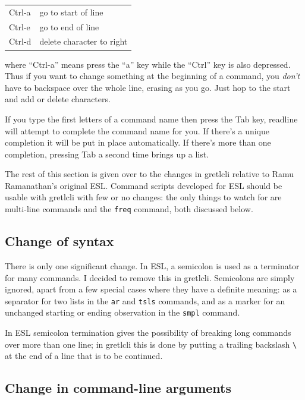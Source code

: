 \documentclass{article}
\begin{document}
\begin{center}
\begin{tabular}{ll}
Ctrl-a & go to start of line\\
Ctrl-e & go to end of line\\
Ctrl-d & delete character to right
\end{tabular}
\end{center}

\noindent
where ``Ctrl-a'' means press the ``a'' key while the ``Ctrl'' key is
also depressed.  Thus if you want to change something at the beginning
of a command, you \textit{don't} have to backspace over the whole
line, erasing as you go.  Just hop to the start and add or delete
characters.

If you type the first letters of a command name then press the Tab
key, readline will attempt to complete the command name for you.  If
there's a unique completion it will be put in place automatically.  If
there's more than one completion, pressing Tab a second time brings up
a list.

The rest of this section is given over to the changes in
\textsf{gretlcli} relative to Ramu Ramanathan's original ESL.  Command
scripts developed for ESL should be usable with \textsf{gretlcli} with
few or no changes: the only things to watch for are multi-line
commands and the \texttt{freq} command, both discussed below.

\subsection{Change of syntax}

There is only one significant change.  In ESL, a semicolon is used as a
terminator for many commands.  I decided to remove this in \textsf{gretlcli}.
Semicolons are simply ignored, apart from a few special cases where
they have a definite meaning: as a separator for two lists in the \texttt{ar}
and \texttt{tsls} commands, and as a marker for an unchanged starting or ending
observation in the \texttt{smpl} command.

In ESL semicolon termination gives the possibility of breaking long
commands over more than one line; in \textsf{gretlcli} this is done
by putting a trailing backslash \verb+\+ at the end of a line that is
to be continued.

\subsection{Change in command-line arguments}
\end{document}
